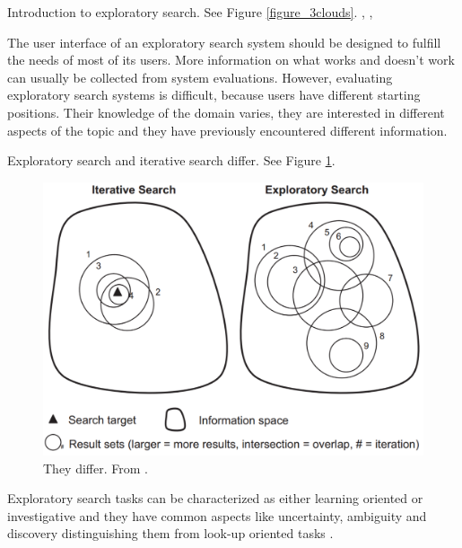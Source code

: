 Introduction to exploratory search. See Figure \ref{figure_3clouds}.
\cite{march06}, \cite{white09}, \cite{tvaro11}

The user interface of an exploratory search system should be designed to fulfill the needs of most of its users. More information on what works and doesn't work can usually be collected from system evaluations.
However, evaluating exploratory search systems is difficult, because users have different starting positions. Their knowledge of the domain varies, they are interested in different aspects of the topic and they have previously encountered different information. \cite{kules08}

Exploratory search and iterative search differ. See Figure \ref{figure_IterativeVsExploratory}.

\begin{figure}[htp] %
\caption{They differ. From \protect\cite{white09}.}
\label{figure_IterativeVsExploratory}
\centering
\includegraphics[scale=0.25]{figures/IterativeSearch_vs_ExploratorySearch.pdf}
\end{figure}

Exploratory search tasks can be characterized as either learning oriented or investigative  and they have common aspects like uncertainty, ambiguity and discovery distinguishing them from look-up oriented tasks \cite{kules09}.


